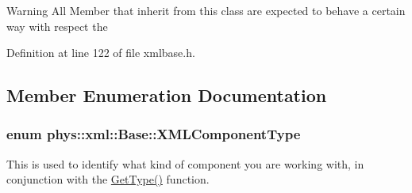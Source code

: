 \begin{DoxyWarning}{Warning}
All Member that inherit from this class are expected to behave a certain way with respect the 
\end{DoxyWarning}


Definition at line 122 of file xmlbase.h.



\subsection{Member Enumeration Documentation}
\hypertarget{classphys_1_1xml_1_1Base_a62ba0484b5ecb502f9ae9d82d3720320}{
\subsubsection[{XMLComponentType}]{\setlength{\rightskip}{0pt plus 5cm}enum {\bf phys::xml::Base::XMLComponentType}}}
\label{df/d10/classphys_1_1xml_1_1Base_a62ba0484b5ecb502f9ae9d82d3720320}


This is used to identify what kind of component you are working with, in conjunction with the \hyperlink{classphys_1_1xml_1_1Base_a46d0361efc953e06f26c059658a9a070}{GetType()} function. 

